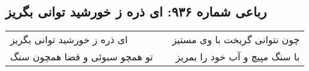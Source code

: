\begin{center}
\section*{رباعی شماره ۹۳۶: ای ذره ز خورشید توانی بگریز}
\label{sec:0936}
\begin{longtable}{l p{0.5cm} r}
ای ذره ز خورشید توانی بگریز
&&
چون نتوانی گریخت با وی مستیز
\\
تو همچو سبوئی و قضا همچون سنگ
&&
با سنگ مپیچ و آب خود را بمریز
\\
\end{longtable}
\end{center}
